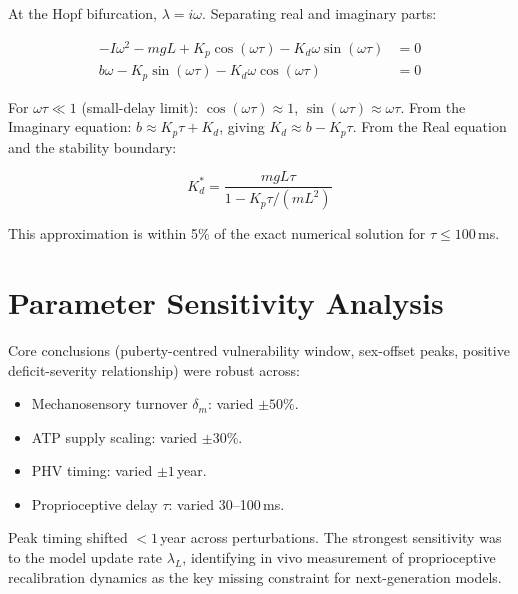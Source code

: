\documentclass[12pt, letterpaper]{article}
\newcommand{\Kd}{K_d}
\newcommand{\Kdcrit}{K_d^{*}}
\begin{document}
At the Hopf bifurcation, $\lambda = i\omega$. Separating real and imaginary
parts:

\begin{align*}
  -I\omega^{2} - mgL + K_p\cos(\omega\tau) - \Kd\omega\sin(\omega\tau) &= 0
    \tag{Real} \\
  b\omega - K_p\sin(\omega\tau) - \Kd\omega\cos(\omega\tau) &= 0
    \tag{Imaginary}
\end{align*}

For $\omega\tau \ll 1$ (small-delay limit):
$\cos(\omega\tau)\approx 1$, $\sin(\omega\tau)\approx\omega\tau$.
From the Imaginary equation: $b \approx K_p\tau + \Kd$, giving
$\Kd \approx b - K_p\tau$.
From the Real equation and the stability boundary:

\begin{equation}
  \Kdcrit = \frac{mgL\tau}{1 - K_p\tau/(mL^{2})}
\end{equation}

This approximation is within 5\% of the exact numerical solution for
$\tau \leq 100$\,ms.

\section{Parameter Sensitivity Analysis}
\label{app:sensitivity}

Core conclusions (puberty-centred vulnerability window, sex-offset peaks,
positive deficit-severity relationship) were robust across:

\begin{itemize}
  \item Mechanosensory turnover $\delta_m$: varied $\pm50\%$.
  \item ATP supply scaling: varied $\pm30\%$.
  \item PHV timing: varied $\pm1$\,year.
  \item Proprioceptive delay $\tau$: varied 30--100\,ms.
\end{itemize}

Peak timing shifted $<1$\,year across perturbations. The strongest sensitivity
was to the model update rate $\lambda_L$, identifying in vivo measurement of
proprioceptive recalibration dynamics as the key missing constraint for
next-generation models.
\end{document}
